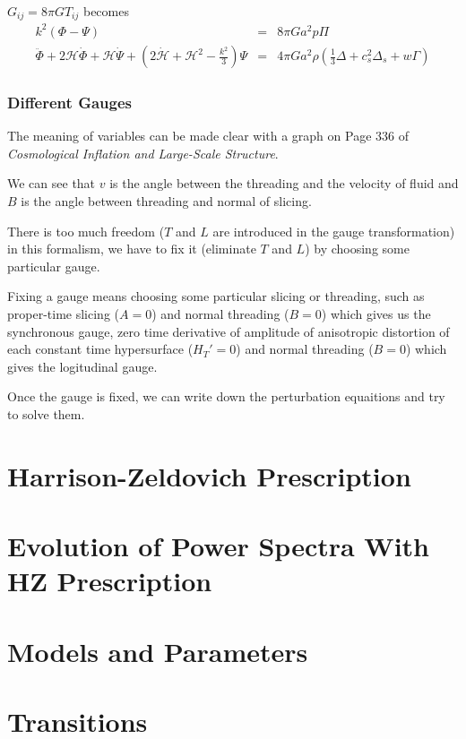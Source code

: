 \documentclass[12pt,a4paper]{book}
\begin{document}
$G_{ij} = 8\pi G T_{ij}$ becomes
\begin{eqnarray}
	k^2(\Phi - \Psi) &=& 8\pi G a^2 p \Pi \\
	\ddot \Phi + 2\mathcal H \dot \Phi + \mathcal H \dot \Psi + (2\dot {\mathcal H} + \mathcal H^2 - \frac{k^2}{3} )\Psi &=& 4\pi G a^2 \rho (\frac13 \Delta + c_s^2 \Delta_s + w \Gamma)
\end{eqnarray}


\subsubsection{Different Gauges}

The meaning of variables can be made clear with a graph on Page 336 of \emph{Cosmological Inflation and Large-Scale Structure}.

We can see that $v$ is the angle between the threading and the velocity of fluid and $B$ is the angle between threading and normal of slicing.

There is too much freedom ($T$ and $L$ are introduced in the gauge transformation) in this formalism, we have to fix it (eliminate $T$ and $L$) by choosing some particular gauge.

Fixing a gauge means choosing some particular slicing or threading, such as proper-time slicing ($A=0$) and normal threading ($B=0$) which gives us the synchronous gauge, zero time derivative of amplitude of anisotropic distortion of each constant time hypersurface ($H_T' = 0$) and normal threading ($B=0$) which gives the logitudinal gauge.


Once the gauge is fixed, we can write down the perturbation equaitions and try to solve them.







\section{Harrison-Zeldovich Prescription}






\section{Evolution of Power Spectra With HZ Prescription}





\section{Models and Parameters}




\section{Transitions}
\end{document}
